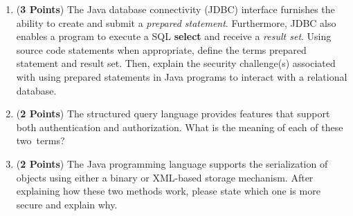 \documentclass[12pt]{article}
\begin{document}
\begin{enumerate}
\begin{enumerate}
                  \item ({\bf 3 Points}) The Java database connectivity (JDBC) interface furnishes the ability to create
                    and submit a {\em prepared statement}.  Furthermore, JDBC also enables a program to execute a SQL
                    {\bf select} and receive a {\em result set}.  Using source code statements when appropriate, define
                    the terms prepared statement and result set. Then, explain the security challenge(s) associated with
                    using prepared statements in Java programs to interact with a relational database.

                  \item ({\bf 2 Points}) The structured query language provides features that support both
                    authentication and authorization. What is the meaning of each of these \mbox{two terms}?

                  \item ({\bf 2 Points}) The Java programming language supports the serialization of objects using
                    either a binary or XML-based storage mechanism. After explaining how these two methods work, please
                    state which one is more secure and explain why.
                    \end{enumerate}

                \end{enumerate}

                
\end{document}
